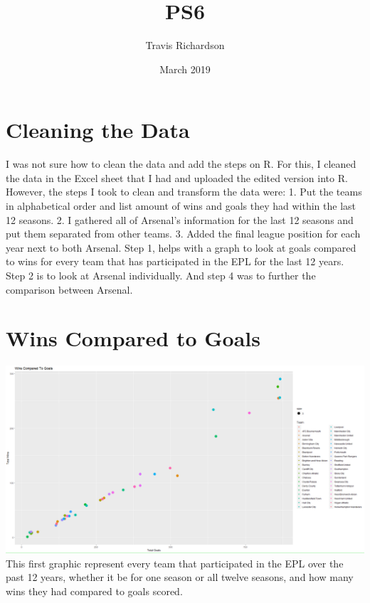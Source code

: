 \documentclass{article}
\title{PS6}
\author{Travis Richardson }
\date{March 2019}
\begin{document}
\maketitle

\section{Cleaning the Data}
I was not sure how to clean the data and add the steps on R. For this, I cleaned the data in the Excel sheet that I had and uploaded the edited version into R. However, the steps I took to clean and transform the data were: 1. Put the teams in alphabetical order and list amount of wins and goals they had within the last 12 seasons. 2. I gathered all of Arsenal's information for the last 12 seasons and put them separated from other teams. 3. Added the final league position for each year next to both Arsenal. Step 1, helps with a graph to look at goals compared to wins for every team that has participated in the EPL for the last 12 years. Step 2 is to look at Arsenal individually. And step 4 was to further the comparison between Arsenal. 
\section{Wins Compared to Goals}
\includegraphics[width=\textwidth]{PS6a_Richardson}
This first graphic represent every team that participated in the EPL over the past 12 years, whether it be for one season or all twelve seasons, and how many wins they had compared to goals scored.
\end{document}
